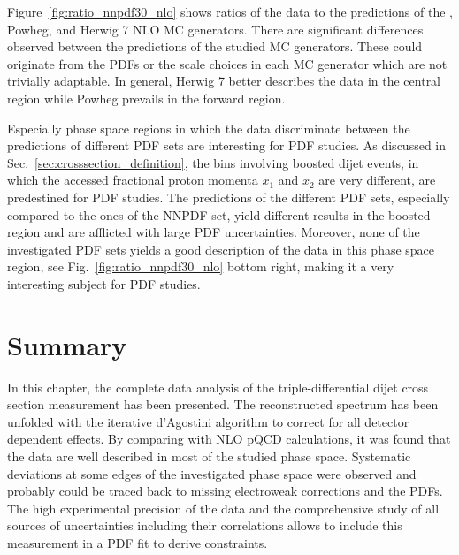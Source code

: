Figure~\ref{fig:ratio_nnpdf30_nlo} shows ratios of the data to the predictions of
the \NLOJETPP, Powheg, and Herwig 7 NLO MC generators. There are significant differences
observed between the predictions of the studied MC generators. These could originate
from the PDFs or the scale choices in each MC generator which are
not trivially adaptable. In general, Herwig 7 better describes the data in the
central region while Powheg prevails in the forward region.

Especially phase space regions in which the data discriminate between the
predictions of different PDF sets are interesting for PDF studies. As
discussed in Sec.~\ref{sec:crosssection_definition}, the bins involving boosted
dijet events, in which the accessed fractional proton momenta $x_1$ and $x_2$
are very different, are predestined for PDF studies. The predictions of the
different PDF sets, especially compared to the ones of the NNPDF set, yield
different results in the boosted region and are afflicted with large PDF
uncertainties. Moreover, none of the investigated PDF sets yields a good
description of the data in this phase space region, see
Fig.~\ref{fig:ratio_nnpdf30_nlo} bottom right, making it a very interesting
subject for PDF studies.

\section{Summary}

In this chapter, the complete data analysis of the triple-differential dijet
cross section measurement has been presented. The reconstructed spectrum has
been unfolded with the iterative d'Agostini algorithm to correct for all
detector dependent effects. By comparing with NLO pQCD calculations, it was
found that the data are well described in most of the studied phase
space. Systematic deviations at some edges of the investigated phase space were
observed and probably could be traced back to missing electroweak corrections and the
PDFs. The high experimental precision of the data and the comprehensive study of
all sources of uncertainties including their correlations allows to include this
measurement in a PDF fit to derive constraints.

